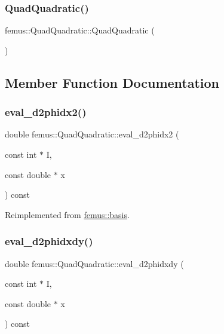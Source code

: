 \subsubsection{\texorpdfstring{Quad\+Quadratic()}{QuadQuadratic()}}
{\footnotesize\ttfamily femus\+::\+Quad\+Quadratic\+::\+Quad\+Quadratic (\begin{DoxyParamCaption}{ }\end{DoxyParamCaption})\hspace{0.3cm}{\ttfamily [inline]}}



\subsection{Member Function Documentation}
\mbox{\label{classfemus_1_1_quad_quadratic_abb3a37830ada326faacf6ff6f30f3fe9}} 
\subsubsection{\texorpdfstring{eval\+\_\+d2phidx2()}{eval\_d2phidx2()}}
{\footnotesize\ttfamily double femus\+::\+Quad\+Quadratic\+::eval\+\_\+d2phidx2 (\begin{DoxyParamCaption}\item[{const int $\ast$}]{I,  }\item[{const double $\ast$}]{x }\end{DoxyParamCaption}) const\hspace{0.3cm}{\ttfamily [virtual]}}



Reimplemented from \mbox{\hyperlink{classfemus_1_1basis_a0a9839e75d1c9c8302486fc072eed028}{femus\+::basis}}.

\mbox{\label{classfemus_1_1_quad_quadratic_a5f8d571d5684cb6f38087c4b3ba4f0b8}} 
\subsubsection{\texorpdfstring{eval\+\_\+d2phidxdy()}{eval\_d2phidxdy()}}
{\footnotesize\ttfamily double femus\+::\+Quad\+Quadratic\+::eval\+\_\+d2phidxdy (\begin{DoxyParamCaption}\item[{const int $\ast$}]{I,  }\item[{const double $\ast$}]{x }\end{DoxyParamCaption}) const\hspace{0.3cm}{\ttfamily [virtual]}}



